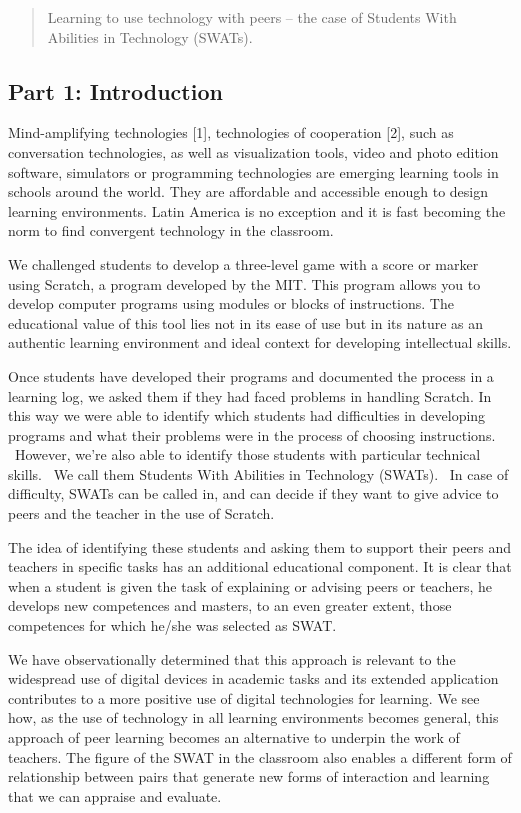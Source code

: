 \begin{quote}
Learning to use technology with peers -- the case of Students With
Abilities in Technology (SWATs).
\end{quote}

\subsection{Part 1: Introduction}\label{part-1-introduction}

Mind-amplifying technologies {{[}1{]}}, technologies of cooperation
{{[}2{]}}, such as conversation technologies, as well as visualization
tools, video and photo edition software, simulators or programming
technologies are emerging learning tools in schools around the world.
They are affordable and accessible enough to design learning
environments. Latin America is no exception and it is fast becoming the
norm to find convergent technology in the classroom.

We challenged students to develop a three-level game with a score or
marker using Scratch, a program developed by the MIT. This program
allows you to develop computer programs using modules or blocks of
instructions. The educational value of this tool lies not in its ease of
use but in its nature as an authentic learning environment and ideal
context for developing intellectual skills.

Once students have developed their programs and documented the process
in a learning log, we asked them if they had faced problems in handling
Scratch. In this way we were able to identify which students had
difficulties in developing programs and what their problems were in the
process of choosing instructions. ~However, we're also able to identify
those students with particular technical skills. ~We call them Students
With Abilities in Technology (SWATs). ~In case of difficulty, SWATs can
be called in, and can decide if they want to give advice to peers and
the teacher in the use of Scratch.

The idea of identifying these students and asking them to support their
peers and teachers in specific tasks has an additional educational
component. It is clear that when a student is given the task of
explaining or advising peers or teachers, he develops new competences
and masters, to an even greater extent, those competences for which
he/she was selected as SWAT.

We have observationally determined that this approach is relevant to the
widespread use of digital devices in academic tasks and its extended
application contributes to a more positive use of digital technologies
for learning. We see how, as the use of technology in all learning
environments becomes general, this approach of peer learning becomes an
alternative to underpin the work of teachers. The figure of the SWAT in
the classroom also enables a different form of relationship between
pairs that generate new forms of interaction and learning that we can
appraise and evaluate.

